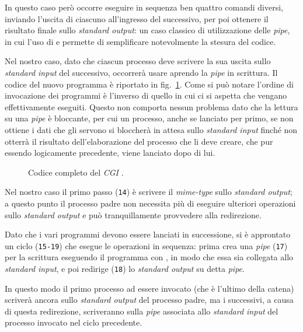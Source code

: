 In questo caso però occorre eseguire in sequenza ben quattro comandi diversi,
inviando l'uscita di ciascuno all'ingresso del successivo, per poi ottenere il
risultato finale sullo \textit{standard output}: un caso classico di
utilizzazione delle \textit{pipe}, in cui l'uso di  e 
permette di semplificare notevolmente la stesura del codice.

Nel nostro caso, dato che ciascun processo deve scrivere la sua uscita sullo
\textit{standard input} del successivo, occorrerà usare  aprendo
la \textit{pipe} in scrittura. Il codice del nuovo programma è riportato in
fig.~\ref{fig:ipc_barcode_code}.  Come si può notare l'ordine di invocazione
dei programmi è l'inverso di quello in cui ci si aspetta che vengano
effettivamente eseguiti. Questo non comporta nessun problema dato che la
lettura su una \textit{pipe} è bloccante, per cui un processo, anche se
lanciato per primo, se non ottiene i dati che gli servono si bloccherà in
attesa sullo \textit{standard input} finché non otterrà il risultato
dell'elaborazione del processo che li deve creare, che pur essendo logicamente
precedente, viene lanciato dopo di lui.

\begin{figure}[!htb]
  \footnotesize \centering
  \begin{minipage}[c]{\codesamplewidth}
  \end{minipage} 
  \normalsize 
  \caption{Codice completo del \textit{CGI} .}
  \label{fig:ipc_barcode_code}
\end{figure}

Nel nostro caso il primo passo (\texttt{\small 14}) è scrivere il
\textit{mime-type} sullo \textit{standard output}; a questo punto il processo
padre non necessita più di eseguire ulteriori operazioni sullo
\textit{standard output} e può tranquillamente provvedere alla redirezione.

Dato che i vari programmi devono essere lanciati in successione, si è
approntato un ciclo (\texttt{\small 15-19}) che esegue le operazioni in
sequenza: prima crea una \textit{pipe} (\texttt{\small 17}) per la scrittura
eseguendo il programma con , in modo che essa sia collegata allo
\textit{standard input}, e poi redirige (\texttt{\small 18}) lo
\textit{standard output} su detta \textit{pipe}.

In questo modo il primo processo ad essere invocato (che è l'ultimo della
catena) scriverà ancora sullo \textit{standard output} del processo padre, ma
i successivi, a causa di questa redirezione, scriveranno sulla \textit{pipe}
associata allo \textit{standard input} del processo invocato nel ciclo
precedente.

